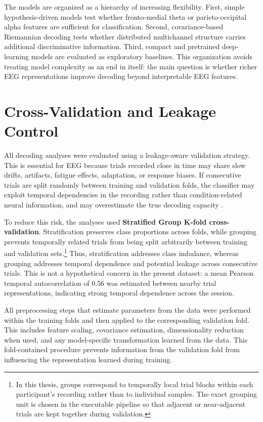 \documentclass[11pt,a4paper,chapterprefix=false,parskip=false]{scrreprt}
\begin{document}
The models are organized as a hierarchy of increasing flexibility. First, simple hypothesis-driven models test whether fronto-medial theta or parieto-occipital alpha features are sufficient for classification. Second, covariance-based Riemannian decoding tests whether distributed multichannel structure carries additional discriminative information. Third, compact and pretrained deep-learning models are evaluated as exploratory baselines. This organization avoids treating model complexity as an end in itself: the main question is whether richer EEG representations improve decoding beyond interpretable EEG features.

\section{Cross-Validation and Leakage Control}
All decoding analyses were evaluated using a leakage-aware validation strategy. This is essential for EEG because trials recorded close in time may share slow drifts, artifacts, fatigue effects, adaptation, or response biases. If consecutive trials are split randomly between training and validation folds, the classifier may exploit temporal dependencies in the recording rather than condition-related neural information, and may overestimate the true decoding capacity \citep{white_k-fold_2023, del_pup_role_2025}.

To reduce this risk, the analyses used \textbf{Stratified Group K-fold cross-validation}. Stratification preserves class proportions across folds, while grouping prevents temporally related trials from being split arbitrarily between training and validation sets.\footnote{In this thesis, groups correspond to temporally local trial blocks within each participant's recording rather than to individual samples. The exact grouping unit is chosen in the executable pipeline so that adjacent or near-adjacent trials are kept together during validation.} Thus, stratification addresses class imbalance, whereas grouping addresses temporal dependence and potential leakage across consecutive trials. This is not a hypothetical concern in the present dataset: a mean Pearson temporal autocorrelation of 0.56 was estimated between nearby trial representations, indicating strong temporal dependence across the session.

All preprocessing steps that estimate parameters from the data were performed within the training folds and then applied to the corresponding validation fold. This includes feature scaling, covariance estimation, dimensionality reduction when used, and any model-specific transformation learned from the data. This fold-contained procedure prevents information from the validation fold from influencing the representation learned during training.
\end{document}
